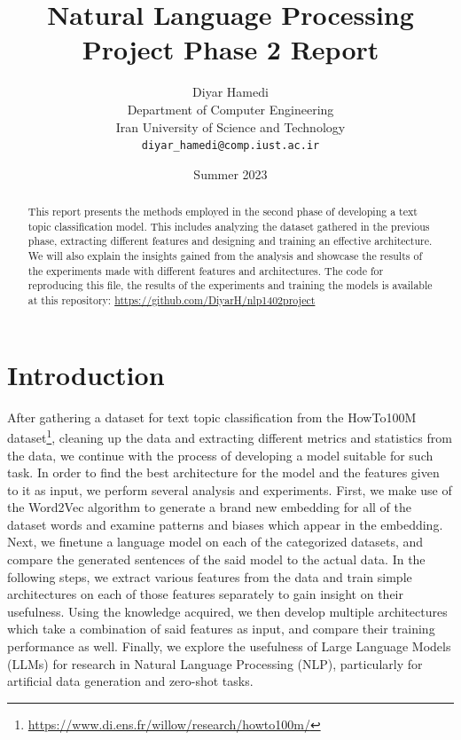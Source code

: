 \documentclass{article}
\title{Natural Language Processing Project Phase 2 Report}
\author{
  Diyar Hamedi\\
  Department of Computer Engineering\\
  Iran University of Science and Technology\\
  \texttt{diyar\_hamedi@comp.iust.ac.ir}\\
}
\date{Summer 2023}
\begin{document}
\pagestyle{fancy}
\fancyhead{}
\setlength{\headheight}{35.11143pt}

\maketitle

\begin{abstract}
  This report presents the methods employed in the second phase of developing a text topic classification model.
  This includes analyzing the dataset gathered in the previous phase, extracting different features and designing and training an effective architecture.
  We will also explain the insights gained from the analysis and showcase the results of the experiments made with different features and architectures.
  The code for reproducing this file, the results of the experiments and training the models is available at this repository: \url{https://github.com/DiyarH/nlp1402project}
\end{abstract}

\section{Introduction}
After gathering a dataset for text topic classification from the HowTo100M dataset\footnote{\url{https://www.di.ens.fr/willow/research/howto100m/}},
cleaning up the data and extracting different metrics and statistics from the data, we continue with the process of developing a model suitable for such task.
In order to find the best architecture for the model and the features given to it as input, we perform several analysis and experiments.
First, we make use of the Word2Vec algorithm to generate a brand new embedding for all of the dataset words and examine patterns and biases which appear in the embedding.
Next, we finetune a language model on each of the categorized datasets, and compare the generated sentences of the said model to the actual data.
In the following steps, we extract various features from the data and train simple architectures on each of those features separately to gain insight on their usefulness.
Using the knowledge acquired, we then develop multiple architectures which take a combination of said features as input, and compare their training performance as well.
Finally, we explore the usefulness of Large Language Models (LLMs) for research in Natural Language Processing (NLP), particularly for artificial data generation and zero-shot tasks.
\end{document}
